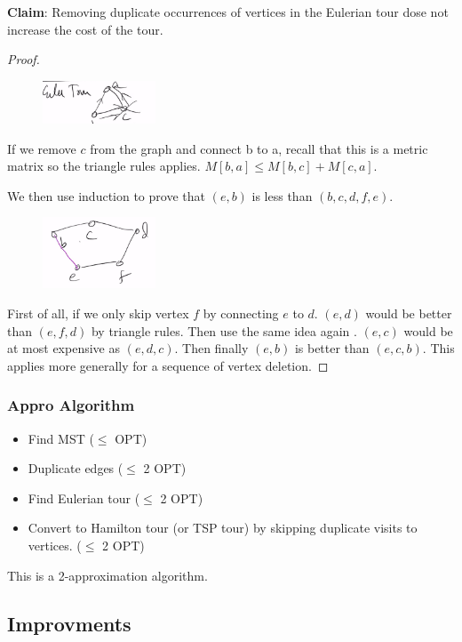 \textbf{Claim}: Removing duplicate occurrences of vertices in the Eulerian tour dose not increase the cost of the tour.

\begin{proof}
	\begin{figure}[H]
		\centering
		\includegraphics[width=0.3\textwidth]{fig/trangle.png}
	\end{figure}
If we remove $c$ from the graph and connect b to a, recall that this is a metric matrix so the triangle rules applies. $M[b, a] \le M[b, c] + M[c, a]$.

We then use induction to prove that $(e,b)$ is less than $(b, c, d, f, e)$.
\begin{figure}[H]
	\centering
	\includegraphics[width=0.3\textwidth]{fig/trangle-short-path.png}
\end{figure}

First of all, if we only skip vertex $f$ by connecting $e$ to $d$. $(e, d)$ would be better than $(e, f, d)$ by triangle rules. Then use the same idea again . $(e, c)$ would be at most expensive as $(e, d, c)$. Then finally $(e,b)$ is better than $(e, c, b)$. This applies more generally for a sequence of vertex deletion.
\end{proof}
\subsubsection{Appro Algorithm}
\begin{itemize}
	\item Find MST ($\le$ OPT)
	\item Duplicate edges ($\le$ 2 OPT)
	\item Find Eulerian tour ($\le$ 2 OPT)
	\item Convert to Hamilton tour (or TSP tour) by skipping duplicate visits to vertices. ($\le$ 2 OPT)
\end{itemize}
This is a 2-approximation algorithm.



\subsection{Improvments}

